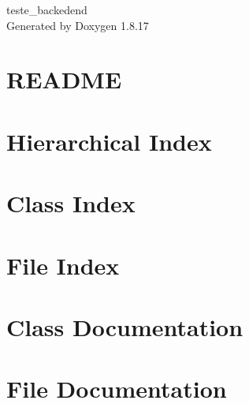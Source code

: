 \let\mypdfximage\pdfximage\def\pdfximage{\immediate\mypdfximage}\documentclass[twoside]{book}
\newcommand{\+}{\discretionary{\mbox{\scriptsize$\hookleftarrow$}}{}{}}
\newcommand{\clearemptydoublepage}{%
  \newpage{\pagestyle{empty}\cleardoublepage}%
}
\begin{document}
\hypersetup{pageanchor=false,
             bookmarksnumbered=true,
             pdfencoding=unicode
            }
\begin{titlepage}
\vspace*{7cm}
\begin{center}%
{\Large teste\+\_\+backedend }\\
\vspace*{1cm}
{\large Generated by Doxygen 1.8.17}\\
\end{center}
\end{titlepage}
\clearemptydoublepage
{}
\tableofcontents
\clearemptydoublepage
{}
\hypersetup{pageanchor=true}

\chapter{R\+E\+A\+D\+ME}
\label{md__r_e_a_d_m_e}

\chapter{Hierarchical Index}

\chapter{Class Index}

\chapter{File Index}

\chapter{Class Documentation}


\chapter{File Documentation}


\backmatter
\newpage
{}
\clearemptydoublepage
{}
\printindex
\end{document}

